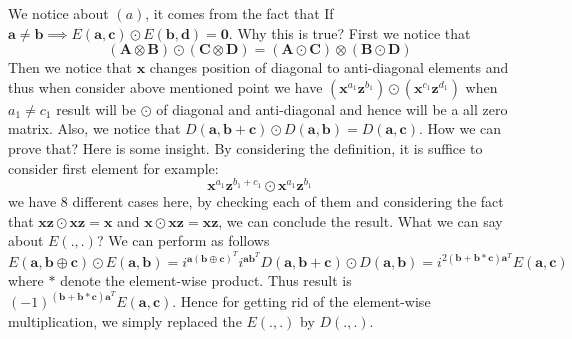 \documentclass{article}
\begin{document}
\begin{enumerate}
	We notice about $(a)$, it comes from the fact that If $\mathbf{a} \neq \mathbf{b} \implies E(\mathbf{a}, \mathbf{c}) \odot E(\mathbf{b}, \mathbf{d}) = \mathbf{0}$. Why this is true? First we notice that 
	\begin{equation*}
		\left(\mathbf{A} \otimes \mathbf{B} \right) \odot \left(\mathbf{C} \otimes  \mathbf{D} \right) = \left(\mathbf{A} \odot \mathbf{C} \right) \otimes \left(\mathbf{B} \odot \mathbf{D}\right)
	\end{equation*}	
	Then we notice that $\mathbf{x}$ changes position of diagonal to anti-diagonal elements and thus when consider above mentioned point we have $\left(\mathbf{x}^{a_1} \mathbf{z}^{b_1}  \right) \odot \left(\mathbf{x}^{c_1} \mathbf{z}^{d_1}  \right)$ when $a_1 \neq c_1$ result will be $\odot$ of diagonal and anti-diagonal and hence will be a all zero matrix. Also, we notice that
	 $D(\mathbf{a, b+c}) \odot D(\mathbf{a, b})=D(\mathbf{a, c})$. How we can prove that? Here is some insight. By considering the definition, it is suffice to consider first element for example:
	\begin{equation*}
		\mathbf{x}^{a_1}\mathbf{z}^{b_1+c_1} \odot \mathbf{x}^{a_1}\mathbf{z}^{b_1}
	\end{equation*}
	we have 8 different cases here, by checking each of them and considering the fact that $\mathbf{x}\mathbf{z}\odot \mathbf{x}\mathbf{z} = \mathbf{x}$ and $\mathbf{x}\odot \mathbf{x}\mathbf{z} = \mathbf{x}\mathbf{z}$, we can conclude the result. What we can say about $E(.,.)$? We can perform as follows
	\begin{equation*}
		E(\mathbf{a,b\oplus c}) \odot E(\mathbf{a,b}) = i^{\mathbf{a}(\mathbf{b\oplus c})^T}i^{\mathbf{a}\mathbf{b}^T}D(\mathbf{a,b+c}) \odot D(\mathbf{a,b}) = i^{2(\mathbf{b+b}*\mathbf{c})\mathbf{a}^T} E(\mathbf{a,c})
	\end{equation*}
	where $*$ denote the element-wise product. Thus result is  $(-1)^{(\mathbf{b+b}*\mathbf{c})\mathbf{a}^T}E(\mathbf{a,c})$. Hence for getting rid of the element-wise multiplication, we simply replaced the $E(.,.)$ by $D(.,.)$.
	
	\end{enumerate}
\end{document}
